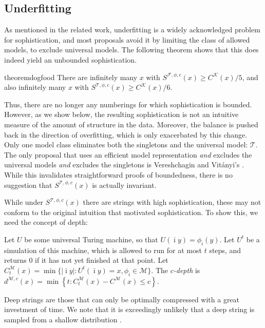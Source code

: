 \documentclass{style/llncs}
\newcommand{\M}{\mathscr M}
\newcommand{\T}{\mathscr T}
\newcommand{\F}{\mathscr F}
\newcommand{\K}{\mathscr K}
\newcommand{\s}{S}
\begin{document}
\subsection{Underfitting}

As mentioned in the related work, underfitting is a widely acknowledged problem for sophistication, and most proposals avoid it by limiting the class of allowed models, to exclude universal models. The following theorem shows that this does indeed yield an unbounded sophistication.

\begin{restatable}{theorem}{dogfood}
There are infinitely many $x$ with $\s^{\F,\phi,c}(x) \geq C^{\K}(x)/5$, and also infinitely many $x$ with $\s^{\T,\phi,c}(x) \geq C^{\K}(x)/6$.
\end{restatable} 

Thus, there are no longer any numberings for which sophistication is bounded. However, as we show below, the resulting sophistication is not an intuitive measure of the amount of structure in the data. Moreover, the balance is pushed back in the direction of overfitting, which is only exacerbated by this change. Only one model class eliminates both the singletons and the universal model: $\T$. The only proposal that uses an efficient model representation \emph{and} excludes the universal models \emph{and} excludes the singletons is Vereshchagin and Vit\'anyi's \cite{vitanyi2004meaningful}. While this invalidates straightforward proofs of boundedness, there is no suggestion that $S^{\T, \phi, c}(x)$ is actually invariant.

While under $S^{\T, \phi, c}(x)$ there are strings with high sophistication, these may not conform to the original intuition that motivated sophistication. To show this, we need the concept of depth:

\begin{definition}\belowdisplayskip=-12pt
Let $U$ be some universal Turing machine, so that $U(\bar\imath y) = \phi_i(y)$. Let $U^t$ be a simulation of this machine, which is allowed to run for at most $t$ steps, and returns $0$ if it has not yet finished at that point. Let $C^\M_t(x) = \min\{|\bar\imath y| : U^t(\bar\imath y) = x, \phi_i \in \M\}$. The \emph{$c$-depth} is $d^{\M,c}(x) = \min \left\{t : C^\M_t(x) - C^\M(x) \leq c \right\}$.
\end{definition}
Deep strings are those that can only be optimally compressed with a great investment of time. We note that it is exceedingly unlikely that a deep string is sampled from a shallow distribution \cite{bloem2014safe,bennett1988logical}.
 
\end{document}
